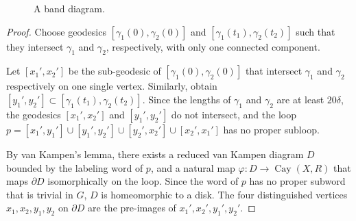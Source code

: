 \documentclass[a4paper]{article}
\DeclareMathOperator{\Cay}{Cay}
\theoremstyle{remark}
\begin{document}
\begin{figure}[h]
\begin{center}
\end{center}
    \caption{A band diagram.}
    \label{diagram between geodesics}
\end{figure}

\begin{proof} 
    Choose geodesics $[\gamma_1(0), \gamma_2(0)]$ and $[\gamma_1(t_1), \gamma_2(t_2)]$ such that they intersect $\gamma_1$ and $\gamma_2$, respectively, with only one connected component.
    
    Let $[x_1',x_2']$ be the sub-geodesic of $[\gamma_1(0), \gamma_2(0)]$ that intersect $\gamma_1$ and $\gamma_2$ respectively on one single vertex. Similarly, obtain $[y_1',y_2']\subset [\gamma_1(t_1), \gamma_2(t_2)]$. Since the lengths of $\gamma_1$ and $\gamma_2$ are at least $20\delta$, the geodesics $[x_1',x_2']$ and $[y_1',y_2']$ do not intersect, and the loop $p = [x_1',y_1'] \cup [y_1',y_2'] \cup [y_2',x_2'] \cup [x_2',x_1']$ has no proper subloop.
    
    By van Kampen's lemma, there exists a reduced van Kampen diagram $D$ bounded by the labeling word of $p$, and a natural map $\varphi:D\to \Cay(X,R)$ that maps $\partial D$ isomorphically on the loop. Since the word of $p$ has no proper subword that is trivial in $G$, $D$ is homeomorphic to a disk. The four distinguished vertices $x_1,x_2,y_1,y_2$ on $\partial D$ are the pre-images of $x_1',x_2',y_1',y_2'$.
\end{proof}
\end{document}
